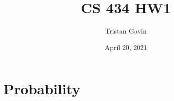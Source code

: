 \documentclass{article}
\title{CS 434 HW1}
\author{Tristan Gavin}
\date{April 20, 2021}
\begin{document}
\maketitle

\section*{Probability}
\end{document}
